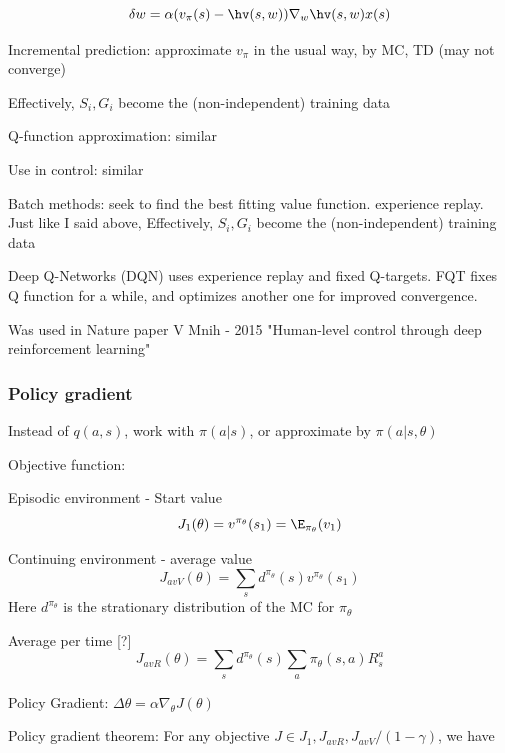 \documentclass[english]{article}
\begin{document}
$$\delta w
=\alpha(v_\pi(s)-\hv(s,w))\nabla_w\hv(s,w)x(s)
$$

\item Incremental prediction: approximate $v_\pi$ in the usual way, by MC, TD (may not converge)

Effectively, $S_i,G_i$ become the (non-independent) training data

\item Q-function approximation: similar

Use in control: similar

\item Batch methods: seek to find the best fitting value function. experience replay. Just like I said above, Effectively, $S_i,G_i$ become the (non-independent) training data


\item Deep Q-Networks (DQN) uses experience replay and fixed Q-targets. FQT fixes Q function for a while, and optimizes another one for improved convergence. 

Was used in Nature paper V Mnih - 2015 "Human-level control through deep reinforcement learning"

\eenum 




\subsubsection{Policy gradient}
\benum

\item Instead of $q(a,s)$, work with $\pi(a|s)$, or approximate by $\pi(a|s,\theta)$

\item Objective function: 

Episodic environment - Start value 
$$J_1(\theta) 
=
v^{\pi_\theta}(s_1) 
=
\E_{\pi_\theta}(v_1)$$

Continuing environment - average value 
$$J_{avV}(\theta) 
=
\sum_s d^{\pi_\theta}(s) v^{\pi_\theta}(s_1) 
$$
Here $d^{\pi_\theta}$ is the strationary distribution of the MC for $\pi_\theta$

Average per time [?]
$$J_{avR}(\theta) 
=
\sum_s d^{\pi_\theta}(s) \sum_a \pi_\theta(s,a) R^a_s 
$$

\item Policy Gradient: $\Delta \theta = \alpha \nabla_\theta J(\theta)$

Policy gradient theorem: For any objective $J\in J_1, J_{avR}, J_{avV}/(1-\gamma)$, we have
\end{document}

